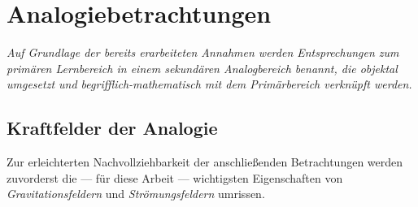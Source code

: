 \chapter{Analogiebetrachtungen}
\label{kap:4}

\textit{Auf Grundlage der bereits erarbeiteten Annahmen werden Entsprechungen zum primären Lernbereich in einem sekundären Analogbereich benannt, die objektal umgesetzt und begrifflich-mathematisch mit dem Primärbereich verknüpft werden.}

\section{Kraftfelder der Analogie}
\label{sec:fields2}
Zur erleichterten Nachvollziehbarkeit der anschließenden Betrachtungen werden zuvorderst die --- für diese Arbeit --- wichtigsten Eigenschaften von \textit{Gravitationsfeldern} und \textit{Strömungsfeldern} umrissen.

